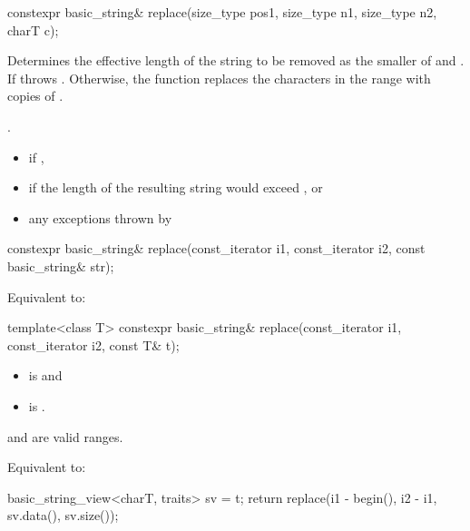 %
\begin{itemdecl}
constexpr basic_string& replace(size_type pos1, size_type n1, size_type n2, charT c);
\end{itemdecl}

\begin{itemdescr}
\pnum
\effects
Determines the effective length  of the string to be
removed as the smaller of  and . If
  throws . Otherwise,
the function replaces the characters in the range
with  copies of .

\pnum
\returns
{}.

\pnum
\throws
\begin{itemize}
\item {} if ,
\item {} if the length of the resulting string
would exceed , or
\item any exceptions thrown by 
\end{itemize}
\end{itemdescr}

%
\begin{itemdecl}
constexpr basic_string& replace(const_iterator i1, const_iterator i2, const basic_string& str);
\end{itemdecl}

\begin{itemdescr}
\pnum
\effects
Equivalent to: 
\end{itemdescr}

%
\begin{itemdecl}
template<class T>
  constexpr basic_string& replace(const_iterator i1, const_iterator i2, const T& t);
\end{itemdecl}

\begin{itemdescr}
\pnum
\constraints
\begin{itemize}
\item
{} is
 and
\item
{} is
.
\end{itemize}

\pnum
\expects
{} and  are valid ranges.

\pnum
\effects
Equivalent to:
\begin{codeblock}
basic_string_view<charT, traits> sv = t;
return replace(i1 - begin(), i2 - i1, sv.data(), sv.size());
\end{codeblock}
\end{itemdescr}

